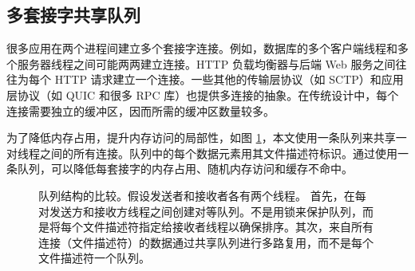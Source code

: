 \subsection{多套接字共享队列}
\label{socksdirect:subsec:multiplex-conn}

很多应用在两个进程间建立多个套接字连接。例如，数据库的多个客户端线程和多个服务器线程之间可能两两建立连接。HTTP 负载均衡器与后端 Web 服务之间往往为每个 HTTP 请求建立一个连接。一些其他的传输层协议（如 SCTP）和应用层协议（如 QUIC 和很多 RPC 库）也提供多连接的抽象。在传统设计中，每个连接需要独立的缓冲区，因而所需的缓冲区数量较多。

为了降低内存占用，提升内存访问的局部性，如图 \ref{socksdirect:fig:fork-rdwr}，本文使用一条队列来共享一对线程之间的所有连接。队列中的每个数据元素用其文件描述符标识。通过使用一条队列，可以降低每套接字的内存占用、随机内存访问和缓存不命中。



\begin{figure}[htbp]
	\centering

	\caption{队列结构的比较。假设发送者和接收者各有两个线程。 首先，在每对发送方和接收方线程之间创建对等队列。不是用锁来保护队列，而是将每个文件描述符指定给接收者线程以确保排序。其次，来自所有连接（文件描述符）的数据通过共享队列进行多路复用，而不是每个文件描述符一个队列。}
	\label{socksdirect:fig:fork-rdwr}
\end{figure}

